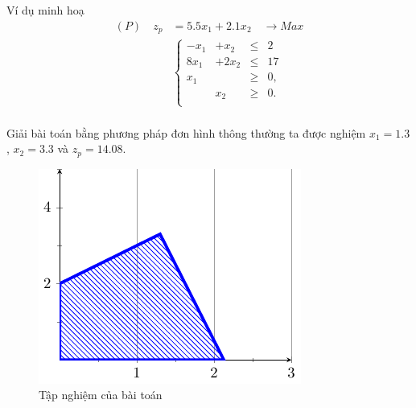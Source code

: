 \documentclass[10pt]{beamer}
\begin{document}
\begin{frame}{Ví dụ minh hoạ}
    \begin{equation*}
        \begin{split}
            (P) \quad z_p&= 5.5x_1 + 2.1x_2 \quad \longrightarrow Max \\
            & \left\{\begin{array}{cccc}
            -x_1 &+ x_2 &\leq& 2 \\
            8x_1 &+ 2x_2 &\leq& 17 \\
            x_1 &&\geq& 0,\\
            &x_2 &\geq& 0. \\
            \end{array}\right. \\
        \end{split}
    \end{equation*}
\end{frame}

\begin{frame}
    Giải bài toán bằng phương pháp đơn hình thông thường ta được nghiệm $x_1 =1.3$, $x_2 = 3.3$ và $z_p=14.08$.
    \vspace{0.5cm}
\begin{figure}[h]
    \centering
    \includegraphics[width=0.4\linewidth]{hinh1.pdf}
    \caption{Tập nghiệm của bài toán}
\end{figure}
\end{frame}
\end{document}
